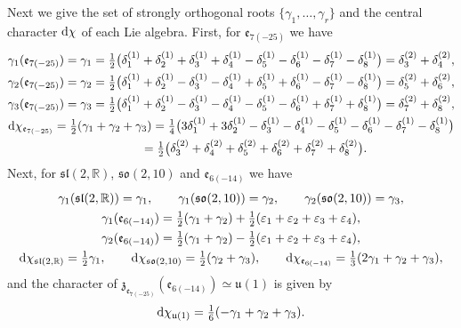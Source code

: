 \documentclass[pdftex]{sigma}
\numberwithin{equation}{section}
\newcommand{\BR}{\mathbb{R}}
\newcommand{\fz}{\mathfrak{z}}
\newcommand{\ve}{\varepsilon}
\begin{document}
Next we give the set of strongly orthogonal roots $\{\gamma_1,\ldots,\gamma_r\}$ and the central character ${\rm d}\chi$ of each Lie algebra.
First, for $\mathfrak{e}_{7(-25)}$ we have
\begin{gather*}
\gamma_1(\mathfrak{e}_{7(-25)}) =\gamma_1
=\tfrac{1}{2}\big(\delta_1^{(1)}+\delta_2^{(1)}+\delta_3^{(1)}+\delta_4^{(1)}-\delta_5^{(1)}-\delta_6^{(1)}-\delta_7^{(1)}-\delta_8^{(1)}\big)
=\delta_3^{(2)}+\delta_4^{(2)},\\
\gamma_2(\mathfrak{e}_{7(-25)}) =\gamma_2
=\tfrac{1}{2}\big(\delta_1^{(1)}+\delta_2^{(1)}-\delta_3^{(1)}-\delta_4^{(1)}+\delta_5^{(1)}+\delta_6^{(1)}-\delta_7^{(1)}-\delta_8^{(1)}\big)
=\delta_5^{(2)}+\delta_6^{(2)},\\
\gamma_3(\mathfrak{e}_{7(-25)}) =\gamma_3
=\tfrac{1}{2}\big(\delta_1^{(1)}+\delta_2^{(1)}-\delta_3^{(1)}-\delta_4^{(1)}-\delta_5^{(1)}-\delta_6^{(1)}+\delta_7^{(1)}+\delta_8^{(1)}\big)
=\delta_7^{(2)}+\delta_8^{(2)},\\
{\rm d}\chi_{\mathfrak{e}_{7(-25)}} =\tfrac{1}{2}(\gamma_1+\gamma_2+\gamma_3)
=\tfrac{1}{4}\big(3\delta_1^{(1)}+3\delta_2^{(1)}-\delta_3^{(1)}-\delta_4^{(1)}-\delta_5^{(1)}-\delta_6^{(1)}-\delta_7^{(1)}-\delta_8^{(1)}\big)\\
\hphantom{{\rm d}\chi_{\mathfrak{e}_{7(-25)}}}{}
=\tfrac{1}{2}\big(\delta_3^{(2)}+\delta_4^{(2)}+\delta_5^{(2)}+\delta_6^{(2)}+\delta_7^{(2)}+\delta_8^{(2)}\big).
\end{gather*}
Next, for $\mathfrak{sl}(2,\BR)$, $\mathfrak{so}(2,10)$ and $\mathfrak{e}_{6(-14)}$ we have
\begin{gather*}
\gamma_1(\mathfrak{sl}(2,\BR))=\gamma_1,\qquad
\gamma_1(\mathfrak{so}(2,10))=\gamma_2,\qquad
\gamma_2(\mathfrak{so}(2,10))=\gamma_3,\\
\gamma_1(\mathfrak{e}_{6(-14)})=\tfrac 12 (\gamma_1+\gamma_2)+\tfrac{1}{2}(\ve_1+\ve_2+\ve_3+\ve_4),\\
\gamma_2(\mathfrak{e}_{6(-14)})=\tfrac12 (\gamma_1+\gamma_2)-\tfrac{1}{2}(\ve_1+\ve_2+\ve_3+\ve_4),\\
{\rm d}\chi_{\mathfrak{sl}(2,\BR)}=\tfrac{1}{2}\gamma_1,\qquad
{\rm d}\chi_{\mathfrak{so}(2,10)}=\tfrac{1}{2}(\gamma_2+\gamma_3),\qquad
{\rm d}\chi_{\mathfrak{e}_{6(-14)}}=\tfrac{1}{3}(2\gamma_1+\gamma_2+\gamma_3),
\end{gather*}
and the character of $\fz_{\mathfrak{e}_{7(-25)}}(\mathfrak{e}_{6(-14)})\simeq\mathfrak{u}(1)$ is given by
\begin{gather*} {\rm d}\chi_{\mathfrak{u}(1)}=\tfrac{1}{6}(-\gamma_1+\gamma_2+\gamma_3). \end{gather*}
\end{document}
